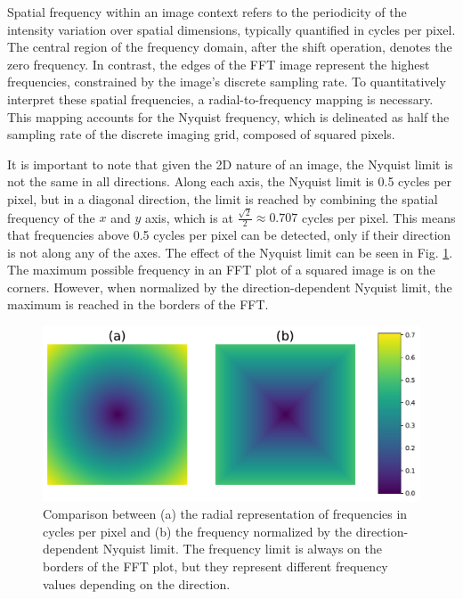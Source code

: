         Spatial frequency within an image context refers to the periodicity of the intensity variation over spatial dimensions, typically quantified in cycles per pixel. The central region of the frequency domain, after the shift operation, denotes the zero frequency. In contrast, the edges of the FFT image represent the highest frequencies, constrained by the image's discrete sampling rate.
        To quantitatively interpret these spatial frequencies, a radial-to-frequency mapping is necessary. This mapping accounts for the Nyquist frequency, which is delineated as half the sampling rate of the discrete imaging grid, composed of squared pixels.

        It is important to note that given the 2D nature of an image, the Nyquist limit is not the same in all directions. 
        Along each axis, the Nyquist limit is 0.5 cycles per pixel, but in a diagonal direction, the limit is reached by combining the spatial frequency of the $x$ and $y$ axis, which is at $\frac{\sqrt{2}}{2} \approx 0.707$ cycles per pixel. 
        This means that frequencies above 0.5 cycles per pixel can be detected, only if their direction is not along any of the axes.
        The effect of the Nyquist limit can be seen in Fig. \ref{fig:5-square_vs_radial}. The maximum possible frequency in an FFT plot of a squared image is on the corners.
        However, when normalized by the direction-dependent Nyquist limit, the maximum is reached in the borders of the FFT.

        \begin{figure}[H]
            \centering
            \includegraphics[width=\linewidth]{Includes/5-square_vs_radial.pdf}
            \caption{Comparison between (a) the radial representation of frequencies in cycles per pixel and (b) the frequency normalized by the direction-dependent Nyquist limit. The frequency limit is always on the borders of the FFT plot, but they represent different frequency values depending on the direction.
            }
            \label{fig:5-square_vs_radial}
        \end{figure}
        
